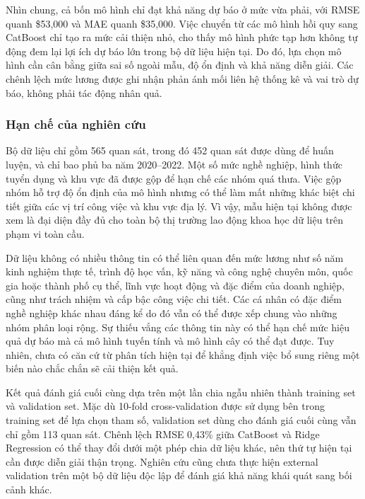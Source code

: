 Nhìn chung, cả bốn mô hình chỉ đạt khả năng dự báo ở mức vừa phải, với
RMSE quanh \$53,000 và MAE quanh \$35,000. Việc chuyển từ các mô hình
hồi quy sang CatBoost chỉ tạo ra mức cải thiện nhỏ, cho thấy mô hình
phức tạp hơn không tự động đem lại lợi ích dự báo lớn trong bộ dữ liệu
hiện tại. Do đó, lựa chọn mô hình cần cân bằng giữa sai số ngoài mẫu, độ
ổn định và khả năng diễn giải. Các chênh lệch mức lương được ghi nhận
phản ánh mối liên hệ thống kê và vai trò dự báo, không phải tác động
nhân quả.

\subsubsection{Hạn chế của nghiên
cứu}\label{nghi:hux1ea1n-chux1ebf-cux1ee7a-nghiuxean-cux1ee9u}

Bộ dữ liệu chỉ gồm 565 quan sát, trong đó 452 quan sát được dùng để huấn
luyện, và chỉ bao phủ ba năm 2020--2022. Một số mức nghề nghiệp, hình
thức tuyển dụng và khu vực đã được gộp để hạn chế các nhóm quá thưa.
Việc gộp nhóm hỗ trợ độ ổn định của mô hình nhưng có thể làm mất những
khác biệt chi tiết giữa các vị trí công việc và khu vực địa lý. Vì vậy,
mẫu hiện tại không được xem là đại diện đầy đủ cho toàn bộ thị trường
lao động khoa học dữ liệu trên phạm vi toàn cầu.

Dữ liệu không có nhiều thông tin có thể liên quan đến mức lương như số
năm kinh nghiệm thực tế, trình độ học vấn, kỹ năng và công nghệ chuyên
môn, quốc gia hoặc thành phố cụ thể, lĩnh vực hoạt động và đặc điểm của
doanh nghiệp, cũng như trách nhiệm và cấp bậc công việc chi tiết. Các cá
nhân có đặc điểm nghề nghiệp khác nhau đáng kể do đó vẫn có thể được xếp
chung vào những nhóm phân loại rộng. Sự thiếu vắng các thông tin này có
thể hạn chế mức hiệu quả dự báo mà cả mô hình tuyến tính và mô hình cây
có thể đạt được. Tuy nhiên, chưa có căn cứ từ phân tích hiện tại để
khẳng định việc bổ sung riêng một biến nào chắc chắn sẽ cải thiện kết
quả.

Kết quả đánh giá cuối cùng dựa trên một lần chia ngẫu nhiên thành
training set và validation set. Mặc dù 10-fold cross-validation được sử
dụng bên trong training set để lựa chọn tham số, validation set dùng cho
đánh giá cuối cùng vẫn chỉ gồm 113 quan sát. Chênh lệch RMSE 0,43\% giữa
CatBoost và Ridge Regression có thể thay đổi dưới một phép chia dữ liệu
khác, nên thứ tự hiện tại cần được diễn giải thận trọng. Nghiên cứu cũng
chưa thực hiện external validation trên một bộ dữ liệu độc lập để đánh
giá khả năng khái quát sang bối cảnh khác.


